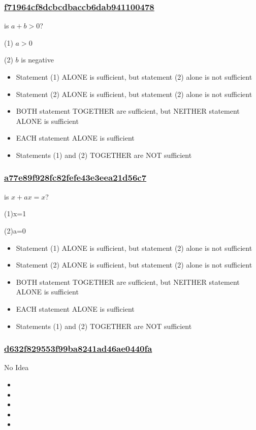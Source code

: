 \documentclass[]{beamer}
\begin{document}
\begin{frame}
    \frametitle{\underline{f71964cf8dcbcdbaccb6dab941100478}}
    is $a+b>0$?\par
(1) $a>0$\par
(2) $b$ is negative
    \begin{itemize}
        \item
            Statement (1) ALONE is sufficient, but statement (2) alone is not sufficient
        \item
            Statement (2) ALONE is sufficient, but statement (2) alone is not sufficient
        \item
            BOTH statement TOGETHER are sufficient, but NEITHER statement ALONE is sufficient
        \item
            EACH statement ALONE is sufficient
        \item
            Statements (1) and (2) TOGETHER are NOT sufficient
    \end{itemize}
\end{frame}
\begin{frame}
    \frametitle{\underline{a77e89f928fc82fefe43e3eea21d56c7}}
    is $x+ax=x$?\par
(1)x=1\par
(2)a=0

    \begin{itemize}
        \item
            Statement (1) ALONE is sufficient, but statement (2) alone is not sufficient
        \item
            Statement (2) ALONE is sufficient, but statement (2) alone is not sufficient
        \item
            BOTH statement TOGETHER are sufficient, but NEITHER statement ALONE is sufficient
        \item
            EACH statement ALONE is sufficient
        \item
            Statements (1) and (2) TOGETHER are NOT sufficient
    \end{itemize}
\end{frame}
\begin{frame}
    \frametitle{\underline{d632f829553f99ba8241ad46ae0440fa}}
    No Idea
    \begin{itemize}
        \item

        \item

        \item

        \item

        \item

    \end{itemize}
\end{frame}
\end{document}
